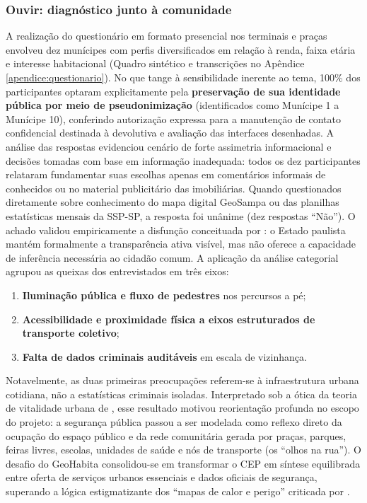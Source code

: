 \documentclass[
    12pt,
    oneside,            %
    a4paper,
    brazilian
    ]{abntex2}
\begin{document}
\subsubsection{Ouvir: diagnóstico junto à comunidade}
A realização do questionário em formato presencial nos terminais e praças envolveu dez munícipes com perfis diversificados em relação à renda, faixa etária e interesse habitacional (Quadro sintético e transcrições no Apêndice \ref{apendice:questionario}). No que tange à sensibilidade inerente ao tema, 100\% dos participantes optaram explicitamente pela \textbf{preservação de sua identidade pública por meio de pseudonimização} (identificados como Munícipe 1 a Munícipe 10), conferindo autorização expressa para a manutenção de contato confidencial destinada à devolutiva e avaliação das interfaces desenhadas. A análise das respostas evidenciou cenário de forte assimetria informacional e decisões tomadas com base em informação inadequada: todos os dez participantes relataram fundamentar suas escolhas apenas em comentários informais de conhecidos ou no material publicitário das imobiliárias. Quando questionados diretamente sobre conhecimento do mapa digital GeoSampa ou das planilhas estatísticas mensais da SSP-SP, a resposta foi unânime (dez respostas ``Não''). O achado validou empiricamente a disfunção conceituada por : o Estado paulista mantém formalmente a transparência ativa visível, mas não oferece a capacidade de inferência necessária ao cidadão comum. A aplicação da análise categorial \cite{bardin2016} agrupou as queixas dos entrevistados em três eixos:



\begin{enumerate}
  \item \textbf{Iluminação pública e fluxo de pedestres} nos percursos a pé;
  \item \textbf{Acessibilidade e proximidade física a eixos estruturados de transporte coletivo};
  \item \textbf{Falta de dados criminais auditáveis} em escala de vizinhança.
\end{enumerate}

Notavelmente, as duas primeiras preocupações referem-se à infraestrutura urbana cotidiana, não a estatísticas criminais isoladas. Interpretado sob a ótica da teoria de vitalidade urbana de , esse resultado motivou reorientação profunda no escopo do projeto: a segurança pública passou a ser modelada como reflexo direto da ocupação do espaço público e da rede comunitária gerada por praças, parques, feiras livres, escolas, unidades de saúde e nós de transporte (os ``olhos na rua''). O desafio do GeoHabita consolidou-se em transformar o CEP em síntese equilibrada entre oferta de serviços urbanos essenciais e dados oficiais de segurança, superando a lógica estigmatizante dos ``mapas de calor e perigo'' criticada por .
\end{document}

